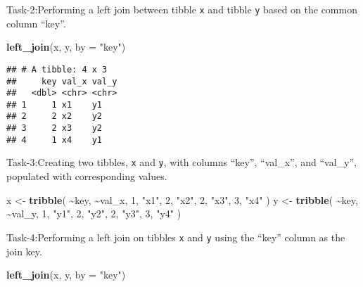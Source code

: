 \documentclass[
]{article}
\newenvironment{Shaded}{\begin{snugshade}}{\end{snugshade}}
\newcommand{\AttributeTok}[1]{\textcolor[rgb]{0.13,0.29,0.53}{#1}}
\newcommand{\DecValTok}[1]{\textcolor[rgb]{0.00,0.00,0.81}{#1}}
\newcommand{\FunctionTok}[1]{\textcolor[rgb]{0.13,0.29,0.53}{\textbf{#1}}}
\newcommand{\NormalTok}[1]{#1}
\newcommand{\OtherTok}[1]{\textcolor[rgb]{0.56,0.35,0.01}{#1}}
\newcommand{\SpecialCharTok}[1]{\textcolor[rgb]{0.81,0.36,0.00}{\textbf{#1}}}
\newcommand{\StringTok}[1]{\textcolor[rgb]{0.31,0.60,0.02}{#1}}
\begin{document}
Task-2:Performing a left join between tibble \texttt{x} and tibble
\texttt{y} based on the common column ``key''.

\begin{Shaded}
\begin{Highlighting}[]
\FunctionTok{left\_join}\NormalTok{(x, y, }\AttributeTok{by =} \StringTok{"key"}\NormalTok{)}
\end{Highlighting}
\end{Shaded}

\begin{verbatim}
## # A tibble: 4 x 3
##     key val_x val_y
##   <dbl> <chr> <chr>
## 1     1 x1    y1   
## 2     2 x2    y2   
## 3     2 x3    y2   
## 4     1 x4    y1
\end{verbatim}

Task-3:Creating two tibbles, \texttt{x} and \texttt{y}, with columns
``key'', ``val\_x'', and ``val\_y'', populated with corresponding
values.

\begin{Shaded}
\begin{Highlighting}[]
\NormalTok{x }\OtherTok{\textless{}{-}} \FunctionTok{tribble}\NormalTok{(}
  \SpecialCharTok{\textasciitilde{}}\NormalTok{key, }\SpecialCharTok{\textasciitilde{}}\NormalTok{val\_x,}
     \DecValTok{1}\NormalTok{, }\StringTok{"x1"}\NormalTok{,}
     \DecValTok{2}\NormalTok{, }\StringTok{"x2"}\NormalTok{,}
     \DecValTok{2}\NormalTok{, }\StringTok{"x3"}\NormalTok{,}
     \DecValTok{3}\NormalTok{, }\StringTok{"x4"}
\NormalTok{)}
\NormalTok{y }\OtherTok{\textless{}{-}} \FunctionTok{tribble}\NormalTok{(}
  \SpecialCharTok{\textasciitilde{}}\NormalTok{key, }\SpecialCharTok{\textasciitilde{}}\NormalTok{val\_y,}
     \DecValTok{1}\NormalTok{, }\StringTok{"y1"}\NormalTok{,}
     \DecValTok{2}\NormalTok{, }\StringTok{"y2"}\NormalTok{,}
     \DecValTok{2}\NormalTok{, }\StringTok{"y3"}\NormalTok{,}
     \DecValTok{3}\NormalTok{, }\StringTok{"y4"}
\NormalTok{)}
\end{Highlighting}
\end{Shaded}

Task-4:Performing a left join on tibbles \texttt{x} and \texttt{y} using
the ``key'' column as the join key.

\begin{Shaded}
\begin{Highlighting}[]
\FunctionTok{left\_join}\NormalTok{(x, y, }\AttributeTok{by =} \StringTok{"key"}\NormalTok{)}
\end{Highlighting}
\end{Shaded}
\end{document}
